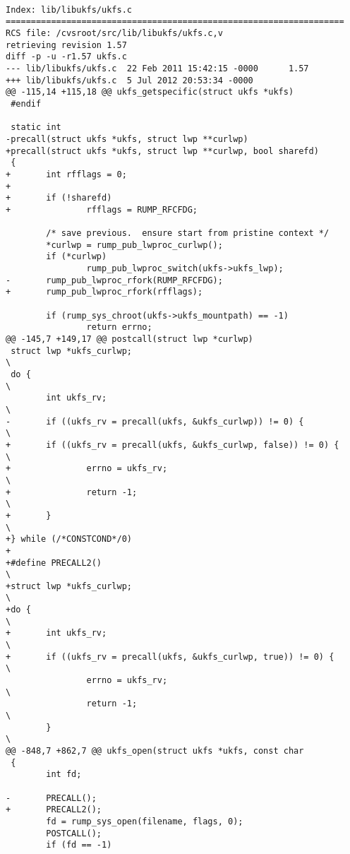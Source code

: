 {\tt \scriptsize
\begin{verbatim}
Index: lib/libukfs/ukfs.c
===================================================================
RCS file: /cvsroot/src/lib/libukfs/ukfs.c,v
retrieving revision 1.57
diff -p -u -r1.57 ukfs.c
--- lib/libukfs/ukfs.c  22 Feb 2011 15:42:15 -0000      1.57
+++ lib/libukfs/ukfs.c  5 Jul 2012 20:53:34 -0000
@@ -115,14 +115,18 @@ ukfs_getspecific(struct ukfs *ukfs)
 #endif

 static int
-precall(struct ukfs *ukfs, struct lwp **curlwp)
+precall(struct ukfs *ukfs, struct lwp **curlwp, bool sharefd)
 {
+       int rfflags = 0;
+
+       if (!sharefd)
+               rfflags = RUMP_RFCFDG;

        /* save previous.  ensure start from pristine context */
        *curlwp = rump_pub_lwproc_curlwp();
        if (*curlwp)
                rump_pub_lwproc_switch(ukfs->ukfs_lwp);
-       rump_pub_lwproc_rfork(RUMP_RFCFDG);
+       rump_pub_lwproc_rfork(rfflags);

        if (rump_sys_chroot(ukfs->ukfs_mountpath) == -1)
                return errno;
@@ -145,7 +149,17 @@ postcall(struct lwp *curlwp)
 struct lwp *ukfs_curlwp;                                               \
 do {                                                                   \
        int ukfs_rv;                                                    \
-       if ((ukfs_rv = precall(ukfs, &ukfs_curlwp)) != 0) {             \
+       if ((ukfs_rv = precall(ukfs, &ukfs_curlwp, false)) != 0) {      \
+               errno = ukfs_rv;                                        \
+               return -1;                                              \
+       }                                                               \
+} while (/*CONSTCOND*/0)
+
+#define PRECALL2()                                                     \
+struct lwp *ukfs_curlwp;                                               \
+do {                                                                   \
+       int ukfs_rv;                                                    \
+       if ((ukfs_rv = precall(ukfs, &ukfs_curlwp, true)) != 0) {       \
                errno = ukfs_rv;                                        \
                return -1;                                              \
        }                                                               \
@@ -848,7 +862,7 @@ ukfs_open(struct ukfs *ukfs, const char
 {
        int fd;

-       PRECALL();
+       PRECALL2();
        fd = rump_sys_open(filename, flags, 0);
        POSTCALL();
        if (fd == -1)
\end{verbatim}}

